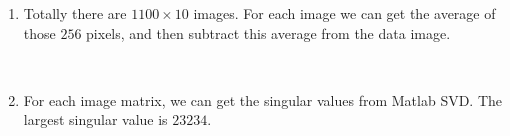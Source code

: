 \documentclass{article}
\begin{document}
\begin{enumerate}
 
 \item 
 Totally there are $1100\times10$ images. For each image we can get the average of those $256$ pixels, and then subtract this average from the data image. 
 \begin{lstlisting}
 
 \end{lstlisting} 
 
 \item 
 For each image matrix, we can get the singular values from Matlab SVD. The largest singular value is $ 23234 $. \\ 
  \begin{lstlisting}
 
 \end{lstlisting} 
 
\end{enumerate} 
\end{document}

